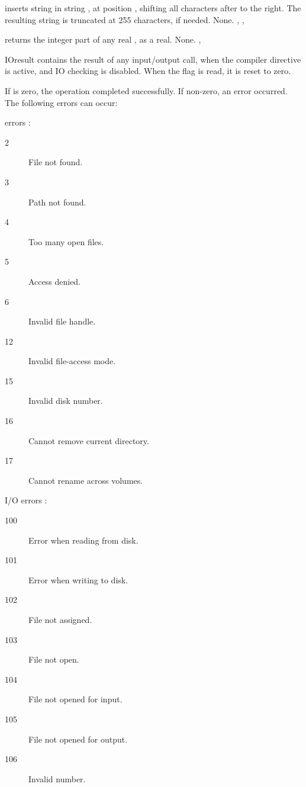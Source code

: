 \documentclass{report}
\begin{document}


{ inserts string  in string , at position
, shifting all characters after  to the right. The
resulting string is truncated at 255 characters, if needed.}
{None.}
{, , }



{ returns the integer part of any real , as a real.}
{None.}
{, }



{IOresult contains the result of any input/output call, when the
 compiler directive is active, and IO checking is disabled. When the
flag is read, it is reset to zero.

If  is zero, the operation completed successfully. If
non-zero, an error occurred. The following errors can occur:

\dos errors :

\begin{description}
\item [2\ ] File not found.
\item [3\ ] Path not found.
\item [4\ ] Too many open files.
\item [5\ ] Access denied.
\item [6\ ] Invalid file handle.
\item [12\ ] Invalid file-access mode.
\item [15\ ] Invalid disk number.
\item [16\ ] Cannot remove current directory.
\item [17\ ] Cannot rename across volumes.
\end{description}

I/O errors :

\begin{description}
\item [100\ ] Error when reading from disk.
\item [101\ ] Error when writing to disk.
\item [102\ ] File not assigned.
\item [103\ ] File not open.
\item [104\ ] File not opened for input.
\item [105\ ] File not opened for output.
\item [106\ ] Invalid number.
\end{description}

}
\end{document}
